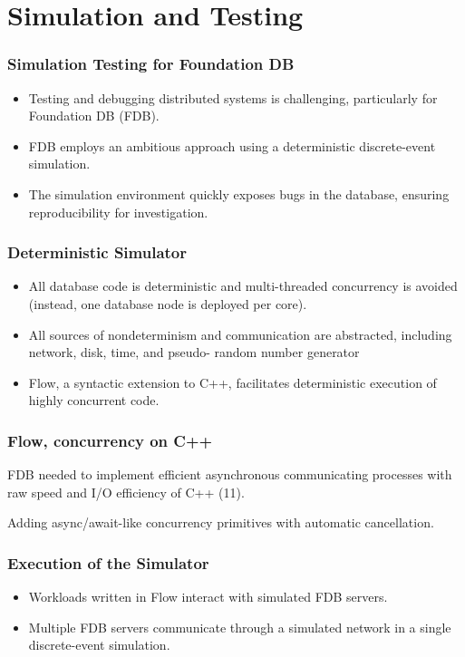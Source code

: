 \section{Simulation and Testing }

\begin{frame}
    \frametitle{Simulation Testing for Foundation DB}
    \begin{itemize}
        \item Testing and debugging distributed systems is challenging, particularly for Foundation DB (FDB).
        \item FDB employs an ambitious approach using a deterministic discrete-event simulation.
        \item The simulation environment quickly exposes bugs in the database, ensuring reproducibility for investigation.
    \end{itemize}
\end{frame}
\begin{frame}
    \frametitle{Deterministic Simulator}
    \begin{itemize}
        \item All database
code is deterministic and multi-threaded concurrency is
avoided (instead, one database node is deployed per core).
        \item All sources of nondeterminism and communication are
abstracted, including network, disk, time, and pseudo-
random number generator
        \item Flow, a syntactic extension to C++, facilitates deterministic execution of highly concurrent code.
    \end{itemize}
\end{frame}

\begin{frame}
    \frametitle{Flow, concurrency on C++}
   FDB needed to implement efficient asynchronous communicating processes with raw speed and I/O efficiency of C++ (11).
\vspace{0.5cm}

Adding async/await-like
concurrency primitives with automatic cancellation.

   
\end{frame}

\begin{frame}
    \frametitle{Execution of the Simulator}
    \begin{itemize}
        \item Workloads written in Flow interact with simulated FDB servers.
        \item Multiple FDB servers communicate through a simulated network in a single discrete-event simulation.
    \end{itemize}
\end{frame}

